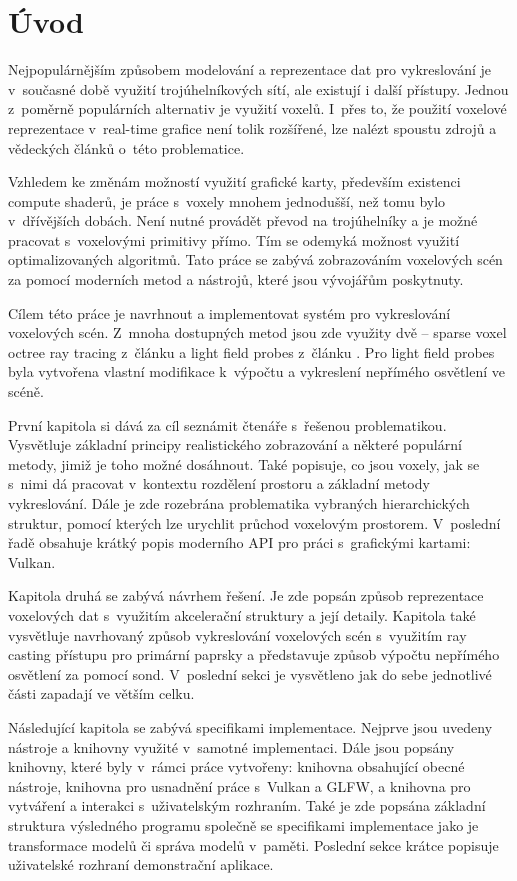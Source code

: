 \chapter{Úvod}
\label{uvod}
Nejpopulárnějším způsobem modelování a reprezentace dat pro vykreslování je v~současné době využití trojúhelníkových sítí, ale existují i další přístupy. Jednou z~poměrně populárních alternativ je využití voxelů. I~přes to, že použití voxelové reprezentace v~real-time grafice není tolik rozšířené, lze nalézt spoustu zdrojů a vědeckých článků o~této problematice.

Vzhledem ke změnám možností využití grafické karty, především existenci compute shaderů, je práce s~voxely mnohem jednodušší, než tomu bylo v~dřívějších dobách. Není nutné provádět převod na trojúhelníky a je možné pracovat s~voxelovými primitivy přímo. Tím se odemyká možnost využití optimalizovaných algoritmů. Tato práce se zabývá zobrazováním voxelových scén za pomocí moderních metod a nástrojů, které jsou vývojářům poskytnuty.

Cílem této práce je navrhnout a implementovat systém pro vykreslování voxelových scén. Z~mnoha dostupných metod jsou zde využity dvě -- sparse voxel octree ray tracing z~článku \cite{Laine2011EfficientSV} a light field probes z~článku \cite{light_field_probes}. Pro light field probes byla vytvořena vlastní modifikace k~výpočtu a vykreslení nepřímého osvětlení ve scéně.

První kapitola si dává za cíl seznámit čtenáře s~řešenou problematikou. Vysvětluje základní principy realistického zobrazování a některé populární metody, jimiž je toho možné dosáhnout. Také popisuje, co jsou voxely, jak se s~nimi dá pracovat v~kontextu rozdělení prostoru a základní metody vykreslování. Dále je zde rozebrána problematika vybraných hierarchických struktur, pomocí kterých lze urychlit průchod voxelovým prostorem. V~poslední řadě obsahuje krátký popis moderního API pro práci s~grafickými kartami: Vulkan.

Kapitola druhá se zabývá návrhem řešení. Je zde popsán způsob reprezentace voxelových dat s~využitím akcelerační struktury a její detaily. Kapitola také vysvětluje navrhovaný způsob vykreslování voxelových scén s~využitím ray casting přístupu pro primární paprsky a představuje způsob výpočtu nepřímého osvětlení za pomocí sond. V~poslední sekci je vysvětleno jak do sebe jednotlivé části zapadají ve větším celku.

Následující kapitola se zabývá specifikami implementace. Nejprve jsou uvedeny nástroje a knihovny využité v~samotné implementaci. Dále jsou popsány knihovny, které byly v~rámci práce vytvořeny: knihovna obsahující obecné nástroje, knihovna pro usnadnění práce s~Vulkan a GLFW, a knihovna pro vytváření a interakci s~uživatelským rozhraním. Také je zde popsána základní struktura výsledného programu společně se specifikami implementace jako je transformace modelů či správa modelů v~paměti. Poslední sekce krátce popisuje uživatelské rozhraní demonstrační aplikace.

